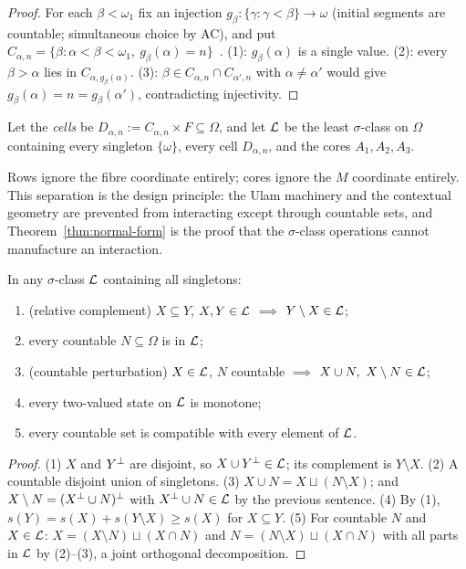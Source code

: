 \begin{proof}
For each $\beta<\omega_1$ fix an injection $g_\beta\colon\{\gamma:\gamma<\beta\}\to\omega$
(initial segments are countable; simultaneous choice by AC), and put
$C_{\alpha,n}=\{\beta : \alpha<\beta<\omega_1,\ g_\beta(\alpha)=n\}$~\cite{Ulam1930}.
(1): $g_\beta(\alpha)$ is a single value. (2): every $\beta>\alpha$ lies in
$C_{\alpha,g_\beta(\alpha)}$. (3): $\beta\in C_{\alpha,n}\cap C_{\alpha',n}$ with
$\alpha\neq\alpha'$ would give $g_\beta(\alpha)=n=g_\beta(\alpha')$, contradicting
injectivity.
\end{proof}

\begin{definition}\label{def:carrier}
Let the \emph{cells} be $D_{\alpha,n} := C_{\alpha,n}\times F\subseteq\Omega$, and
let $\mathcal{L}$ be the least $\sigma$-class on $\Omega$ containing every singleton
$\{\omega\}$, every cell $D_{\alpha,n}$, and the cores $A_1,A_2,A_3$.
\end{definition}

Rows ignore the fibre coordinate entirely; cores ignore the $M$ coordinate
entirely. This separation is the design principle: the Ulam machinery and the
contextual geometry are prevented from interacting except through countable
sets, and Theorem~\ref{thm:normal-form} is the proof that the $\sigma$-class
operations cannot manufacture an interaction.

\begin{lemma}\label{lem:sigma-class-basics}
In any $\sigma$-class $\mathcal{L}$ containing all singletons:
\begin{enumerate}[label=\textup{(\arabic*)}]
  \item (relative complement) $X\subseteq Y$, $X,Y\in\mathcal{L}$ $\implies$
    $Y\setminus X\in\mathcal{L}$;
  \item every countable $N\subseteq\Omega$ is in $\mathcal{L}$;
  \item (countable perturbation) $X\in\mathcal{L}$, $N$ countable $\implies$
    $X\cup N,\ X\setminus N\in\mathcal{L}$;
  \item every two-valued state on $\mathcal{L}$ is monotone;
  \item every countable set is compatible with every element of $\mathcal{L}$.
\end{enumerate}
\end{lemma}

\begin{proof}
(1) $X$ and $Y{}^{\perp}$ are disjoint, so $X\cup Y{}^{\perp}\in\mathcal{L}$; its complement is
$Y\setminus X$. (2) A countable disjoint union of singletons. (3)
$X\cup N = X\sqcup(N\setminus X)$; and $X\setminus N = (X{}^{\perp}\cup N){}^{\perp}$ with
$X{}^{\perp}\cup N\in\mathcal{L}$ by the previous sentence. (4) By (1),
$s(Y)=s(X)+s(Y\setminus X)\ge s(X)$ for $X\subseteq Y$. (5) For countable $N$ and
$X\in\mathcal{L}$: $X=(X\setminus N)\sqcup(X\cap N)$ and $N=(N\setminus X)\sqcup(X\cap N)$
with all parts in $\mathcal{L}$ by (2)--(3), a joint orthogonal decomposition.
\end{proof}


